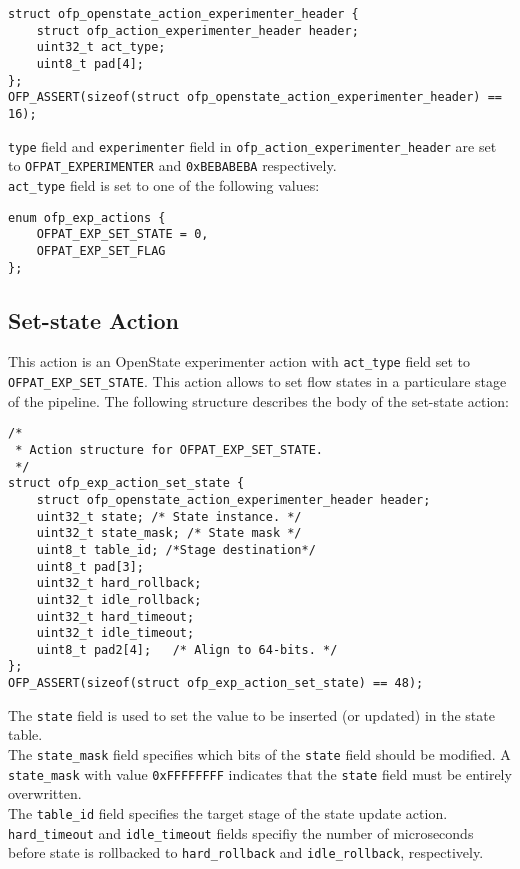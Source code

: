 \scriptsize\begin{verbatim}
struct ofp_openstate_action_experimenter_header {
    struct ofp_action_experimenter_header header;
    uint32_t act_type;
    uint8_t pad[4];
};
OFP_ASSERT(sizeof(struct ofp_openstate_action_experimenter_header) == 16);
\end{verbatim}\normalsize
\texttt{type} field and \texttt{experimenter} field in \texttt{ofp\_action\_experimenter\_header} are set to \texttt{OFPAT\_EXPERIMENTER} and \texttt{0xBEBABEBA} respectively.
\\
\texttt{act\_type} field is set to one of the following values:

\scriptsize\begin{verbatim}
enum ofp_exp_actions {
    OFPAT_EXP_SET_STATE = 0,
    OFPAT_EXP_SET_FLAG
};
\end{verbatim}\normalsize

\subsection{Set-state Action}
\label{sec:act_set_state_proto}

This action is an OpenState experimenter action with \texttt{act\_type} field set to \texttt{OFPAT\_EXP\_SET\_STATE}. This action allows to set flow states in a particulare stage of the pipeline. The following structure describes the body of the set-state action:

\scriptsize\begin{verbatim}
/*
 * Action structure for OFPAT_EXP_SET_STATE.
 */
struct ofp_exp_action_set_state {
    struct ofp_openstate_action_experimenter_header header;
    uint32_t state; /* State instance. */
    uint32_t state_mask; /* State mask */
    uint8_t table_id; /*Stage destination*/
    uint8_t pad[3];
    uint32_t hard_rollback;
    uint32_t idle_rollback;
    uint32_t hard_timeout;
    uint32_t idle_timeout;
    uint8_t pad2[4];   /* Align to 64-bits. */
};
OFP_ASSERT(sizeof(struct ofp_exp_action_set_state) == 48);
\end{verbatim}\normalsize
The \texttt{state} field is used to set the value to be inserted (or updated) in the state table.
\\
The \texttt{state\_mask} field specifies which bits of the \texttt{state} field should be modified. A \texttt{state\_mask} with value \texttt{0xFFFFFFFF} indicates that the \texttt{state} field must be entirely overwritten.
\\
The \texttt{table\_id} field specifies the target stage of the state update action.
\\
\texttt{hard\_timeout} and \texttt{idle\_timeout} fields specifiy the number of microseconds before state is rollbacked to \texttt{hard\_rollback} and \texttt{idle\_rollback}, respectively.

